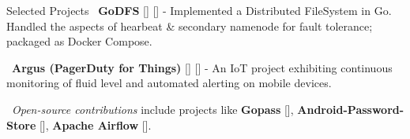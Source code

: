 \documentclass{resume}
\begin{document}
    \begin{rSection}{Selected Projects}
    \textbullet\ \textbf{\textsf{GoDFS}} [\textbf{\href{https://rounakdatta.github.io/posts/godfs}{}}] [\textbf{\href{https://github.com/rounakdatta/GoDFS}{}}] -  Implemented a  Distributed FileSystem in Go. Handled the aspects of hearbeat \& secondary namenode for fault tolerance; packaged as Docker Compose.

    \textbullet\ \textbf{\textsf{Argus (PagerDuty for Things)}} [\textbf{\href{https://rounakdatta.github.io/posts/pagerduty-for-iot}{}}] [\textbf{\href{https://github.com/rounakdatta?tab=repositories&q=argus}{}}] - An IoT project exhibiting continuous monitoring of fluid level and automated alerting on mobile devices.

    \textbullet\ \emph{Open-source contributions} include projects like \textbf{\textsf{Gopass}} [\textbf{\href{https://github.com/gopasspw/gopassbridge}{}}], \textbf{\textsf{Android-Password-Store}} [\textbf{\href{https://github.com/android-password-store/Android-Password-Store}{}}], \textbf{\textsf{Apache Airflow}} [\textbf{\href{https://github.com/apache/airflow}{}}].

  \end{rSection}
\end{document}
